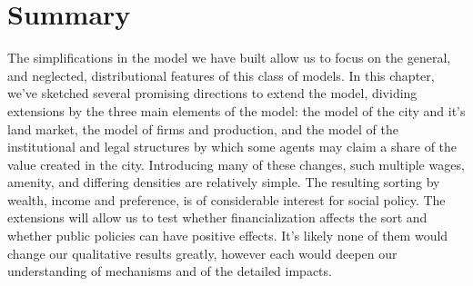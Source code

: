 
\section{Summary}
The simplifications in the model we have built
allow us to focus on the general, and neglected, distributional features of this class of models. In this chapter, we've sketched several promising directions to extend the model, 
dividing extensions by the three main elements of the model: the model of the city and it's land market, the model of firms and production, and the model of the institutional and legal structures by which some agents may claim a share of the value created in the city. %
Introducing many of these changes, such multiple wages, amenity, and differing densities are relatively simple. The resulting sorting by wealth, income and preference, is of considerable interest for social policy. The extensions will allow us to test whether financialization affects the sort and whether public policies can have positive effects. It's likely none of them would change our qualitative results greatly, however each would deepen our understanding of mechanisms and of the detailed impacts. 




